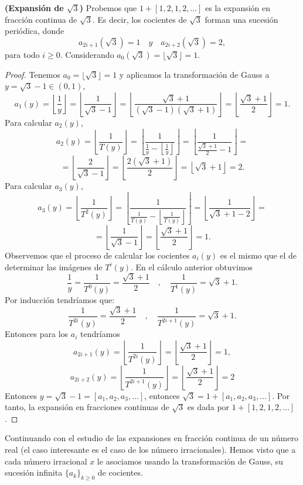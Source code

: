 \break

\begin{ejem}
\textbf{(Expansión de $\sqrt{3}$)} Probemos que $1+[1,2,1,2,\ldots]$ es la expansión en fracción continua de $\sqrt{3}$. Es decir, los cocientes de $\sqrt{3}$ forman una sucesión periódica, donde
$$
a_{2i+1}(\sqrt{3})=1 \quad y \quad a_{2i+2}(\sqrt{3})=2,
$$
para todo $i\geq0$.
Considerando $a_{0}(\sqrt{3})=\lfloor\sqrt{3}\rfloor=1.
$

\end{ejem}
\begin{proof}
Tenemos $a_{0}=\lfloor\sqrt{3}\rfloor=1$ y aplicamos la transformación de Gauss a $y = \sqrt{3}-1 \in (0,1)$,
$$
a_{1}(y)=\left\lfloor\frac{1}{y}\right\rfloor=\left\lfloor\frac{1}{\sqrt{3}-1}\right\rfloor=\left\lfloor\frac{\sqrt{3}+1}{(\sqrt{3}-1)(\sqrt{3}+1)}\right\rfloor=\left\lfloor\frac{\sqrt{3}+1}{2}\right\rfloor=1.
$$
Para calcular $a_{2}(y)$,
$$
a_{2}(y)=\left\lfloor\frac{1}{T(y)}\right\rfloor=\left\lfloor\frac{1}{\frac{1}{y}-\left\lfloor\frac{1}{y}\right\rfloor}\right\rfloor=\left\lfloor\frac{1}{\frac{\sqrt{3}+1}{2}-1}\right\rfloor=
$$
$$
=\left\lfloor\frac{2}{\sqrt{3}-1}\right\rfloor=\left\lfloor\frac{2(\sqrt{3}+1)}{2}\right\rfloor=\left\lfloor\sqrt{3}+1\right\rfloor=2.
$$
Para calcular $a_{3}(y)$,
$$
a_{3}(y)=\left\lfloor\frac{1}{T^{2}(y)}\right\rfloor=\left\lfloor\frac{1}{\frac{1}{T(y)}-\left\lfloor\frac{1}{T(y)}\right\rfloor}\right\rfloor=\left\lfloor\frac{1}{\sqrt{3}+1-2}\right\rfloor=
$$
$$
=\left\lfloor\frac{1}{\sqrt{3}-1}\right\rfloor=\left\lfloor\frac{\sqrt{3}+1}{2}\right\rfloor=1.
$$
Observemos que el proceso de calcular los cocientes $a_{i}(y)$ es el mismo que el de determinar las imágenes de $T^{i}(y)$. En el cálculo anterior obtuvimos
$$
\frac{1}{y}=\frac{1}{T^{0}(y)}=\frac{\sqrt{3}+1}{2}\quad,\quad \frac{1}{T^{1}(y)}=\sqrt{3}+1.
$$
Por inducción tendríamos que:
$$
\frac{1}{T^{2i}(y)}=\frac{\sqrt{3}+1}{2}\quad,\quad\frac{1}{T^{2i+1}(y)}=\sqrt{3}+1.
$$
Entonces para los $a_{i}$ tendríamos
$$
a_{2i+1}(y)=\left\lfloor\frac{1}{T^{2i}(y)}\right\rfloor = \left\lfloor\frac{\sqrt{3}+1}{2}\right\rfloor=1,
$$
$$
a_{2i+2}(y)=\left\lfloor\frac{1}{T^{2i+1}(y)}\right\rfloor = \left\lfloor\frac{\sqrt{3}+1}{2}\right\rfloor=2
$$
Entonces $y=\sqrt{3}-1=[a_{1},a_{2},a_{3},\ldots]$, entonces $\sqrt{3}=1+[a_{1},a_{2},a_{3},\ldots]$. Por tanto, la expansión en fracciones continuas de $\sqrt{3}$ es dada por $1+[1,2,1,2,\ldots]$.
\end{proof}

Continuando con el estudio de las expansiones en fracción continua de un número real (el caso interesante es el caso de los número irracionales). Hemos visto que a cada número irracional $x$ le asociamos usando la transformación de Gauss, su sucesión infinita $\{a_{k}\}_{k\geq0}$ de cocientes. 
\\


